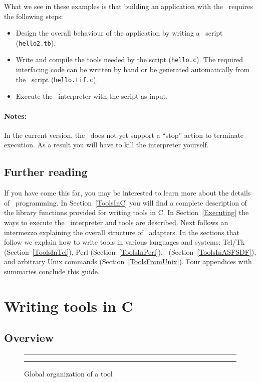 \documentclass[a4,twoside,noweb]{article} %
\begin{document}
What we see in these examples is that
building an application with the \TB\ requires the following steps:
\begin{itemize}
\item Design the overall behaviour of the application by writing a \T\ script ({\tt hello2.tb}).
\item Write and compile the tools needed by the script ({\tt hello.c}).
The required interfacing code can be written by hand or be generated
automatically from the \T\ script ({\tt hello.tif.c}).
\item Execute the \TB\ interpreter with the script as input.
\end{itemize}

\paragraph{Notes:}

In the current version, the \TB\ does not yet support a ``stop'' action
to terminate execution. As a result you will have to kill the interpreter yourself.

\subsection{Further reading}
If you have come this far, you may be interested to learn more about the details
of \TB\ programming.
In Section~\ref{ToolsInC} you will find a complete description
of the library functions provided for writing tools in C.
In Section~\ref{Executing} the ways to execute the \TB\ interpreter
and tools are described.
Next follows an intermezzo explaining the overall structure of \TB\ adapters.
In the sections that follow we explain how to write tools in various languages
and systems: Tcl/Tk (Section~\ref{ToolsInTcl}),
Perl (Section~\ref{ToolsInPerl}),
\ASFSDF\ (Section~\ref{ToolsInASFSDF}), 
and arbitrary Unix commands (Section~\ref{ToolsFromUnix}).
Four appendices with summaries conclude this guide.

\section{\label{ToolsInC}Writing tools in C}

\subsection{Overview}

\begin{figure}[tb]
\rule{\textwidth}{0.5mm}
  
  \centerline{\box\graph}
  \caption{Global organization of a tool}
  \label{fig:Tool}
\rule{\textwidth}{0.5mm}
\end{figure}
\end{document}
